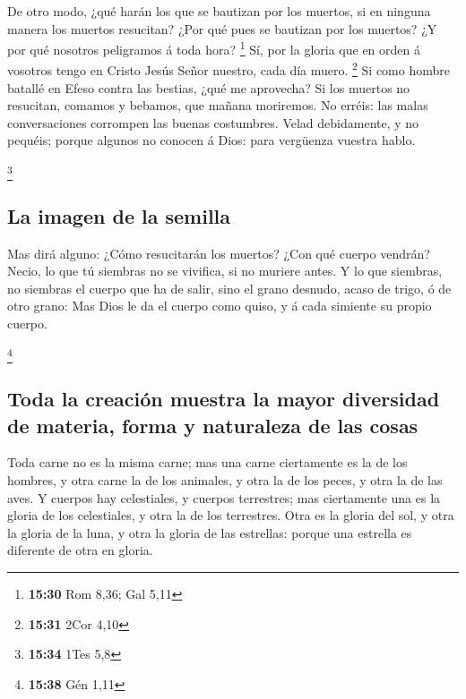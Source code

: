  De otro modo, ¿qué harán los que se bautizan por los
muertos, si en ninguna manera los muertos resucitan? ¿Por qué pues se
bautizan por los muertos?  ¿Y por qué nosotros peligramos á
toda hora? \footnote{\textbf{15:30} Rom 8,36; Gal 5,11} 
Sí, por la gloria que en orden á vosotros tengo en Cristo Jesús Señor
nuestro, cada día muero. \footnote{\textbf{15:31} 2Cor 4,10}
 Si como hombre batallé en Efeso contra las bestias, ¿qué
me aprovecha? Si los muertos no resucitan, comamos y bebamos, que mañana
moriremos.  No erréis: las malas conversaciones corrompen
las buenas costumbres.  Velad debidamente, y no pequéis;
porque algunos no conocen á Dios: para vergüenza vuestra hablo.

\footnote{\textbf{15:34} 1Tes 5,8}

\hypertarget{la-imagen-de-la-semilla}{%
\subsection{La imagen de la semilla}\label{la-imagen-de-la-semilla}}

 Mas dirá alguno: ¿Cómo resucitarán los muertos? ¿Con qué
cuerpo vendrán?  Necio, lo que tú siembras no se vivifica,
si no muriere antes.  Y lo que siembras, no siembras el
cuerpo que ha de salir, sino el grano desnudo, acaso de trigo, ó de otro
grano:  Mas Dios le da el cuerpo como quiso, y á cada
simiente su propio cuerpo.

\footnote{\textbf{15:38} Gén 1,11}

\hypertarget{toda-la-creaciuxf3n-muestra-la-mayor-diversidad-de-materia-forma-y-naturaleza-de-las-cosas}{%
\subsection{Toda la creación muestra la mayor diversidad de materia,
forma y naturaleza de las
cosas}\label{toda-la-creaciuxf3n-muestra-la-mayor-diversidad-de-materia-forma-y-naturaleza-de-las-cosas}}

 Toda carne no es la misma carne; mas una carne ciertamente
es la de los hombres, y otra carne la de los animales, y otra la de los
peces, y otra la de las aves.  Y cuerpos hay celestiales, y
cuerpos terrestres; mas ciertamente una es la gloria de los celestiales,
y otra la de los terrestres.  Otra es la gloria del sol, y
otra la gloria de la luna, y otra la gloria de las estrellas: porque una
estrella es diferente de otra en gloria.

